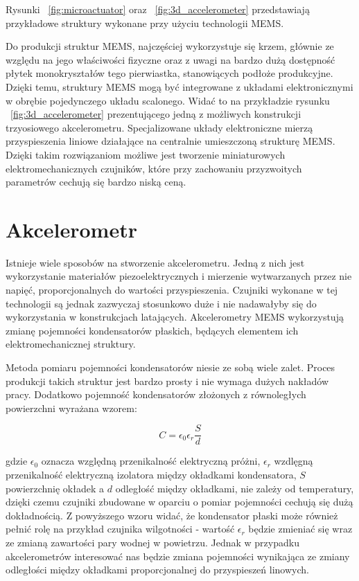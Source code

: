Rysunki ~\ref{fig:microactuator} oraz ~\ref{fig:3d_accelerometer} przedstawiają przykładowe struktury wykonane przy użyciu technologii MEMS. 

Do produkcji struktur MEMS, najczęściej wykorzystuje się krzem, głównie ze względu na jego właściwości fizyczne oraz z uwagi na bardzo dużą dostępność płytek monokryształów tego pierwiastka, stanowiących podłoże produkcyjne. Dzięki temu, struktury MEMS mogą być integrowane z układami elektronicznymi w obrębie pojedynczego układu scalonego. Widać to na przykładzie rysunku ~\ref{fig:3d_accelerometer} prezentującego jedną z możliwych konstrukcji trzyosiowego akcelerometru. Specjalizowane układy elektroniczne mierzą przyspieszenia liniowe działające na centralnie umieszczoną strukturę MEMS. Dzięki takim rozwiązaniom możliwe jest tworzenie miniaturowych elektromechanicznych czujników, które przy zachowaniu przyzwoitych parametrów cechują się bardzo niską ceną.   

\section{Akcelerometr}

Istnieje wiele sposobów na stworzenie akcelerometru. Jedną z nich jest wykorzystanie materiałów piezoelektrycznych i mierzenie wytwarzanych przez nie napięć, proporcjonalnych do wartości przyspieszenia. Czujniki wykonane w tej technologii są jednak zazwyczaj stosunkowo duże i nie nadawałyby się do wykorzystania w konstrukcjach latających. Akcelerometry MEMS wykorzystują zmianę pojemności kondensatorów płaskich, będących elementem ich elektromechanicznej struktury.

Metoda pomiaru pojemności kondensatorów niesie ze sobą wiele zalet. Proces produkcji takich struktur jest bardzo prosty i nie wymaga dużych nakładów pracy. Dodatkowo pojemność kondensatorów złożonych z równoległych powierzchni wyrażana wzorem:   

\begin{equation}
C = \epsilon_0\epsilon_r\frac{S}{d}
\end{equation}

gdzie $\epsilon_0$ oznacza względną przenikalność elektryczną próżni, $\epsilon_r$ wzdlęgną przenikalność elektryczną izolatora między okładkami kondensatora, $S$ powierzchnię okładek a $d$ odległość między okładkami, nie zależy od temperatury, dzięki czemu czujniki zbudowane w oparciu o pomiar pojemności cechują się dużą dokładnością. Z powyższego wzoru widać, że kondensator płaski może również pełnić rolę na przykład czujnika wilgotności - wartość $\epsilon_r$ będzie zmieniać się wraz ze zmianą zawartości pary wodnej w powietrzu. Jednak w przypadku akcelerometrów interesować nas będzie zmiana pojemności wynikająca ze zmiany odległości między okładkami proporcjonalnej do przyspieszeń linowych.


